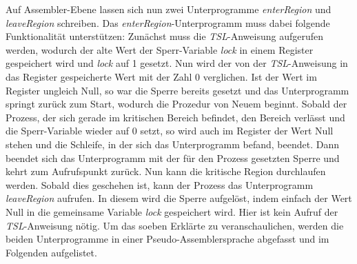 \begin{description}
\begin{description}
								Auf Assembler-Ebene lassen sich nun zwei Unterprogramme \textit{enterRegion} und \textit{leaveRegion} schreiben. Das \textit{enterRegion}-Unterprogramm muss dabei folgende Funktionalität unterstützen: Zunächst muss die \textit{TSL}-Anweisung aufgerufen werden, wodurch der alte Wert der Sperr-Variable \textit{lock} in einem Register gespeichert wird und \textit{lock} auf 1 gesetzt. Nun wird der von der \textit{TSL}-Anweisung in das Register gespeicherte Wert mit der Zahl 0 verglichen. Ist der Wert im Register ungleich Null, so war die Sperre bereits gesetzt und das Unterprogramm springt zurück zum Start, wodurch die Prozedur von Neuem beginnt. Sobald der Prozess, der sich gerade im kritischen Bereich befindet, den Bereich verlässt und die Sperr-Variable wieder auf 0 setzt, so wird auch im Register der Wert Null stehen und die Schleife, in der sich das Unterprogramm befand, beendet. Dann beendet sich das Unterprogramm mit der für den Prozess gesetzten Sperre und kehrt zum Aufrufspunkt zurück. Nun kann die kritische Region durchlaufen werden. Sobald dies geschehen ist, kann der Prozess das Unterprogramm \textit{leaveRegion} aufrufen. In diesem wird die Sperre aufgelöst, indem einfach der Wert Null in die gemeinsame Variable \textit{lock} gespeichert wird. Hier ist kein Aufruf der \textit{TSL}-Anweisung nötig.
								Um das soeben Erklärte zu veranschaulichen, werden die beiden Unterprogramme in einer Pseudo-Assemblersprache abgefasst und im Folgenden aufgelistet.
		
								
								

\end{description}
\end{description}
